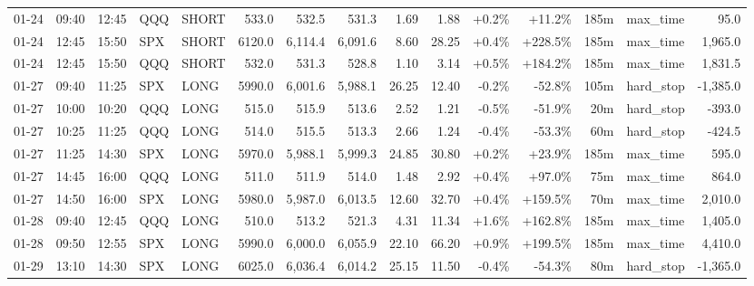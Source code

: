 \documentclass[11pt,a4paper,twoside]{article}
\begin{document}
\begin{landscape}
\begin{center}
\begin{longtable}{>{\color{txtmain}}l l l l l r r r r r r r r >{\color{txtmain}}l r}
01-24 & 09:40 & 12:45 & QQQ & SHORT & 533.0 & 532.5 & 531.3 & 1.69 & 1.88 & \textcolor{wingreen}{+0.2\%} & \textcolor{wingreen}{+11.2\%} & 185m & max\_time & \textcolor{wingreen}{95.0} \\
01-24 & 12:45 & 15:50 & SPX & SHORT & 6120.0 & 6,114.4 & 6,091.6 & 8.60 & 28.25 & \textcolor{wingreen}{+0.4\%} & \textcolor{wingreen}{+228.5\%} & 185m & max\_time & \textcolor{wingreen}{1,965.0} \\
01-24 & 12:45 & 15:50 & QQQ & SHORT & 532.0 & 531.3 & 528.8 & 1.10 & 3.14 & \textcolor{wingreen}{+0.5\%} & \textcolor{wingreen}{+184.2\%} & 185m & max\_time & \textcolor{wingreen}{1,831.5} \\
01-27 & 09:40 & 11:25 & SPX & LONG & 5990.0 & 6,001.6 & 5,988.1 & 26.25 & 12.40 & \textcolor{lossred}{-0.2\%} & \textcolor{lossred}{-52.8\%} & 105m & hard\_stop & \textcolor{lossred}{-1,385.0} \\
01-27 & 10:00 & 10:20 & QQQ & LONG & 515.0 & 515.9 & 513.6 & 2.52 & 1.21 & \textcolor{lossred}{-0.5\%} & \textcolor{lossred}{-51.9\%} & 20m & hard\_stop & \textcolor{lossred}{-393.0} \\
01-27 & 10:25 & 11:25 & QQQ & LONG & 514.0 & 515.5 & 513.3 & 2.66 & 1.24 & \textcolor{lossred}{-0.4\%} & \textcolor{lossred}{-53.3\%} & 60m & hard\_stop & \textcolor{lossred}{-424.5} \\
01-27 & 11:25 & 14:30 & SPX & LONG & 5970.0 & 5,988.1 & 5,999.3 & 24.85 & 30.80 & \textcolor{wingreen}{+0.2\%} & \textcolor{wingreen}{+23.9\%} & 185m & max\_time & \textcolor{wingreen}{595.0} \\
01-27 & 14:45 & 16:00 & QQQ & LONG & 511.0 & 511.9 & 514.0 & 1.48 & 2.92 & \textcolor{wingreen}{+0.4\%} & \textcolor{wingreen}{+97.0\%} & 75m & max\_time & \textcolor{wingreen}{864.0} \\
01-27 & 14:50 & 16:00 & SPX & LONG & 5980.0 & 5,987.0 & 6,013.5 & 12.60 & 32.70 & \textcolor{wingreen}{+0.4\%} & \textcolor{wingreen}{+159.5\%} & 70m & max\_time & \textcolor{wingreen}{2,010.0} \\
01-28 & 09:40 & 12:45 & QQQ & LONG & 510.0 & 513.2 & 521.3 & 4.31 & 11.34 & \textcolor{wingreen}{+1.6\%} & \textcolor{wingreen}{+162.8\%} & 185m & max\_time & \textcolor{wingreen}{1,405.0} \\
01-28 & 09:50 & 12:55 & SPX & LONG & 5990.0 & 6,000.0 & 6,055.9 & 22.10 & 66.20 & \textcolor{wingreen}{+0.9\%} & \textcolor{wingreen}{+199.5\%} & 185m & max\_time & \textcolor{wingreen}{4,410.0} \\
01-29 & 13:10 & 14:30 & SPX & LONG & 6025.0 & 6,036.4 & 6,014.2 & 25.15 & 11.50 & \textcolor{lossred}{-0.4\%} & \textcolor{lossred}{-54.3\%} & 80m & hard\_stop & \textcolor{lossred}{-1,365.0} \\

\end{longtable}
\end{center}
\end{landscape}
\end{document}
